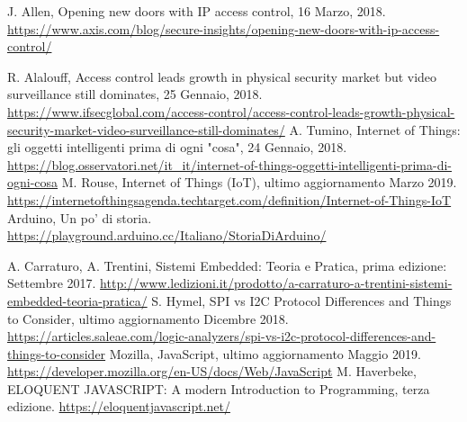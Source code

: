 \documentclass[12pt]{report}
\begin{document}
%
\begin{thebibliography}{00}
%
%	

J. Allen, Opening new doors with IP access control, 16 Marzo, 2018. \url{https://www.axis.com/blog/secure-insights/opening-new-doors-with-ip-access-control/}
%

R. Alalouff, Access control leads growth in physical security market but video surveillance still dominates, 25 Gennaio, 2018.
\url{https://www.ifsecglobal.com/access-control/access-control-leads-growth-physical-security-market-video-surveillance-still-dominates/}
%
A. Tumino, Internet of Things: gli oggetti intelligenti prima di ogni "cosa", 24 Gennaio, 2018.
\url{https://blog.osservatori.net/it_it/internet-of-things-oggetti-intelligenti-prima-di-ogni-cosa}
%
M. Rouse, Internet of Things (IoT), ultimo aggiornamento Marzo 2019.
\url{https://internetofthingsagenda.techtarget.com/definition/Internet-of-Things-IoT}
% 
Arduino, Un po' di storia.
\url{https://playground.arduino.cc/Italiano/StoriaDiArduino/}
%

A. Carraturo, A. Trentini, Sistemi Embedded: Teoria e Pratica, prima edizione: Settembre 2017.
\url{http://www.ledizioni.it/prodotto/a-carraturo-a-trentini-sistemi-embedded-teoria-pratica/}
%
S. Hymel, SPI vs I2C Protocol Differences and Things to Consider, ultimo aggiornamento Dicembre 2018.
\url{https://articles.saleae.com/logic-analyzers/spi-vs-i2c-protocol-differences-and-things-to-consider}
%
Mozilla, JavaScript, ultimo aggiornamento Maggio 2019.
\url{https://developer.mozilla.org/en-US/docs/Web/JavaScript}
%
M. Haverbeke, ELOQUENT JAVASCRIPT: A modern Introduction to Programming, terza edizione.
\url{https://eloquentjavascript.net/}
\end{thebibliography}
%
\end{document}
